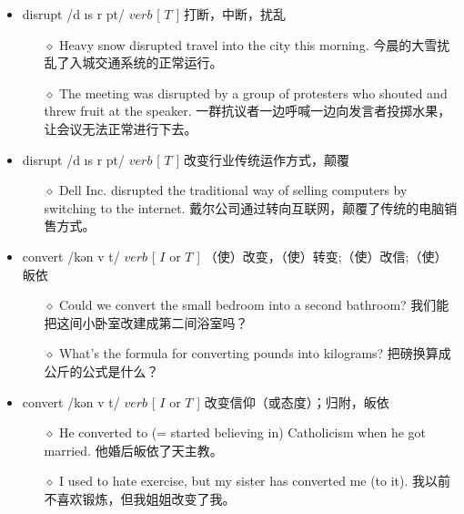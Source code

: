 \documentclass[a4paper,top=2.5cm,buttom=2.5cm10.5pt]{book}
\begin{document}
\begin{itemize}
\item disrupt /d \i s \textprimstress r \textturnv pt/ $ verb $ [  $ T $  ] 打断，中断，扰乱
\begin{itemize}
\item[$\diamond$] Heavy snow disrupted travel into the city this morning.
今晨的大雪扰乱了入城交通系统的正常运行。
\item[$\diamond$] The meeting was disrupted by a group of protesters who shouted and threw fruit at the speaker.
一群抗议者一边呼喊一边向发言者投掷水果，让会议无法正常进行下去。
\end{itemize}
\end{itemize}
\begin{itemize}
\item disrupt /d \i s \textprimstress r \textturnv pt/ $ verb $ [  $ T $  ] 改变行业传统运作方式，颠覆
\begin{itemize}
\item[$\diamond$] Dell Inc. disrupted the traditional way of selling computers by switching to the internet.
戴尔公司通过转向互联网，颠覆了传统的电脑销售方式。
\end{itemize}
\end{itemize}
\begin{itemize}
\item convert /kən \textprimstress v \textrevepsilon  \textlengthmark t/ $ verb $ [  $ I $  or  $ T $  ] （使）改变，（使）转变;（使）改信;（使）皈依
\begin{itemize}
\item[$\diamond$] Could we convert the small bedroom into a second bathroom?
我们能把这间小卧室改建成第二间浴室吗？
\item[$\diamond$] What's the formula for converting pounds into kilograms?
把磅换算成公斤的公式是什么？
\end{itemize}
\end{itemize}
\begin{itemize}
\item convert /kən \textprimstress v \textrevepsilon  \textlengthmark t/ $ verb $ [  $ I $  or  $ T $  ] 改变信仰（或态度）；归附，皈依
\begin{itemize}
\item[$\diamond$] He converted to (= started believing in) Catholicism when he got married.
他婚后皈依了天主教。
\item[$\diamond$] I used to hate exercise, but my sister has converted me (to it).
我以前不喜欢锻炼，但我姐姐改变了我。
\end{itemize}
\end{itemize}
\end{document}
